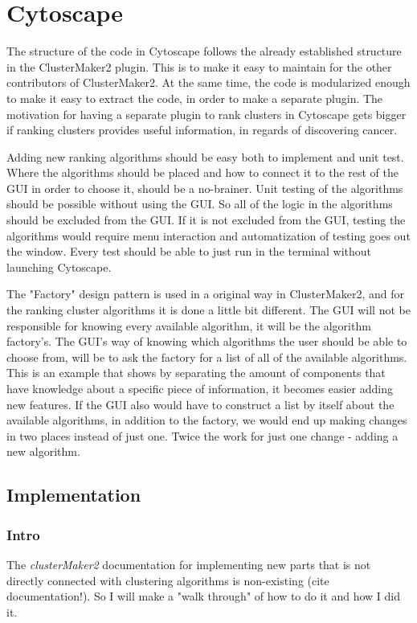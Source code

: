 \part{Cytoscape} %
\label{pa:cytoscape}
The structure of the code in Cytoscape follows the already established structure
in the ClusterMaker2 plugin. This is to make it easy to maintain for the other
contributors of ClusterMaker2. At the same time, the code is modularized enough
to make it easy to extract the code, in order to make a separate plugin. The
motivation for having a separate plugin to rank clusters in Cytoscape gets
bigger if ranking clusters provides useful information, in regards of
discovering cancer.

Adding new ranking algorithms should be easy both to implement and unit test.
Where the algorithms should be placed and how to connect it to the rest of the
GUI in order to choose it, should be a no-brainer. Unit testing of the
algorithms should be possible without using the GUI. So all of the logic in the
algorithms should be excluded from the GUI. If it is not excluded from the GUI,
testing the algorithms would require menu interaction and automatization of
testing goes out the window. Every test should be able to just run in the
terminal without launching Cytoscape.

The "Factory" design pattern %
is used in a original way in ClusterMaker2, and for the ranking cluster
algorithms it is done a little bit different.  The GUI will not be responsible
for knowing every available algorithm, it will be the algorithm factory's. The
GUI's way of knowing which algorithms the user should be able to choose from,
will be to ask the factory for a list of all of the available algorithms. This
is an example that shows by separating the amount of components that have
knowledge about a specific piece of information, it becomes easier adding new
features. If the GUI also would have to construct a list by itself about the
available algorithms, in addition to the factory, we would end up making changes
in two places instead of just one. Twice the work for just one change - adding a
new algorithm.

\chapter{Implementation}

\section{Intro}
The \textit{clusterMaker2} documentation for implementing new parts that is not
directly connected with clustering algorithms is non-existing (cite
documentation!). So I will make a "walk through" of how to do it and how I did it.

